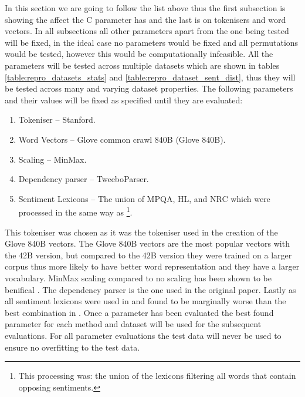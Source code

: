 In this section we are going to follow the list above thus the first subsection is showing the affect the C parameter has and the last is on tokenisers and word vectors. In all subsections all other parameters apart from the one being tested will be fixed, in the ideal case no parameters would be fixed and all permutations would be tested, however this would be computationally infeasible. All the parameters will be tested across multiple datasets which are shown in tables \ref{table:repro_datasets_stats} and \ref{table:repro_dataset_sent_dist}, thus they will be tested across many and varying dataset properties. The following parameters and their values will be fixed as specified until they are evaluated:
\begin{enumerate}
    \item Tokeniser -- Stanford. 
    \item Word Vectors -- Glove common crawl 840B (Glove 840B).
    \item Scaling -- MinMax.
    \item Dependency parser -- TweeboParser.
    \item Sentiment Lexicons -- The union of MPQA, HL, and NRC which were processed in the same way as \citet{repro_vo_2015}\footnote{This processing was: the union of the lexicons filtering all words that contain opposing sentiments.}.
\end{enumerate}
This tokeniser was chosen as it was the tokeniser used in the creation of the Glove 840B vectors. The Glove 840B vectors are the most popular vectors with the 42B version, but compared to the 42B version they were trained on a larger corpus thus more likely to have better word representation and they have a larger vocabulary. MinMax scaling compared to no scaling has been shown to be benifical \citep{repro_moore_2018}. The dependency parser is the one used in the original paper. Lastly as all sentiment lexicons were used in \citet{repro_wang_2017} and found to be marginally worse than the best combination in \citet{repro_vo_2015}. Once a parameter has been evaluated the best found parameter for each method and dataset will be used for the subsequent evaluations. For all parameter evaluations the test data will never be used to ensure no overfitting to the test data. 

